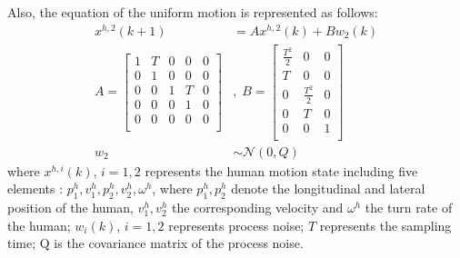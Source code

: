 \documentclass[letterpaper, 10 pt, conference]{ieeeconf}
\begin{document}
	Also, the equation of the uniform motion is represented as follows:
	\begin{subequations}
		\begin{align*}
		x^{h,2}(k+1)&= Ax^{h,2}(k)+Bw_2(k) \label{eqn:h_d_dyn}\\
		A=\left[
		\begin{array}{ccccc}
		1& T& 0& 0& 0\\
		0& 1& 0& 0& 0\\
		0& 0& 1& T& 0\\
		0& 0& 0& 1& 0\\
		0& 0& 0& 0& 0\\
		\end{array}\right]&,\;
		B=\left[
		\begin{array}{ccc}
		\frac{T^2}{2}& 0& 0\\
		T& 0& 0\\
		0& \frac{T^2}{2}& 0\\
		0& T& 0\\
		0& 0& 1\\
		\end{array}\right] \\
		w_2&\sim\mathcal{N}(0,Q)
		\end{align*}
	\end{subequations}
	where $x^{h,i}(k)$, $i=1,2$ represents the human motion state including five elements : $p^h_1,v^h_1,p^h_2,v^h_2,\omega^h$, where $p^h_1,p^h_2$ denote the longitudinal and lateral position of the human, $v^h_1,v^h_2$ the corresponding velocity and $\omega^h$ the turn rate of the human; $w_i(k)$, $i=1,2$ represents process noise; $T$ represents the sampling time; Q is the covariance matrix of the process noise.
	
\end{document}
